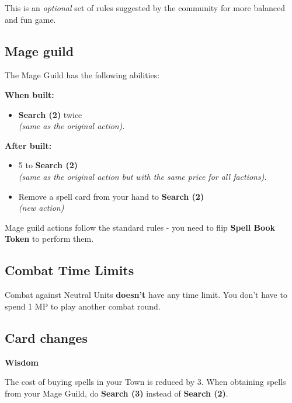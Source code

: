 
\begin{multicols*}{2}

This is an \textit{optional} set of rules suggested by the community for more balanced and fun game.

\subsection*{Mage guild}

The Mage Guild has the following abilities:

\textbf{When built:}
\begin{itemize}
    \item \textbf{Search (2)}  twice \\ \textit{(same as the original action)}.
\end{itemize}

\textbf{After built:}
\begin{itemize}
    \item {} 5  to \textbf{Search (2)}  \\ \textit{(same as the original action but with the same price for all factions)}.
    \item Remove a spell card from your hand to \textbf{Search (2)}  \\ \textit{(new action)}
\end{itemize}

Mage guild actions follow the standard rules - you need to flip \textbf{Spell Book Token} to perform them.

\subsection*{Combat Time Limits}

Combat against Neutral Units \textbf{doesn't} have any time limit. You don't have to spend 1 MP to play another combat round.

\subsection*{Card changes}

\textbf{Wisdom}

The cost of buying spells in your Town is reduced by 3. When obtaining spells from your Mage Guild, 
do \textbf{Search (3)} instead of \textbf{Search (2)}.


\end{multicols*}
